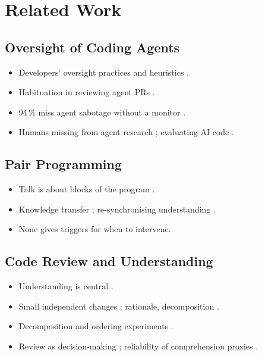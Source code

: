 

\chapter{Related Work}
\label{chap:related}

\section{Oversight of Coding Agents}
\begin{itemize}
  \item Developers' oversight practices and heuristics \citep{dhanorkar_human_2026}.
  \item Habituation in reviewing agent PRs \citep{yu_habituation_2026}.
  \item 94\,\% miss agent sabotage without a monitor \citep{ye_coding_2026}.
  \item Humans missing from agent research \citep{wang_humans_2026}; evaluating AI code \citep{khalid_dont_2026}.
\end{itemize}

\section{Pair Programming}
\begin{itemize}
  \item Talk is about blocks of the program \citep{bryant_pair_2008}.
  \item Knowledge transfer \citep{plonka_knowledge_2015}; re-synchronising understanding \citep{zieris_observations_2016}.
  \item None gives triggers for when to intervene.
\end{itemize}

\section{Code Review and Understanding}
\begin{itemize}
  \item Understanding is central \citep{bacchelli_expectations_2013,sadowski_modern_2018}.
  \item Small independent changes \citep{rigby_convergent_2013}; rationale, decomposition \citep{tao_how_2012}.
  \item Decomposition and ordering experiments \citep{dibiase_effects_2019,baum_associating_2019}.
  \item Review as decision-making \citep{gullstrand_code_2026}; reliability of comprehension proxies \citep{arvan_reliability_2026}.
\end{itemize}

